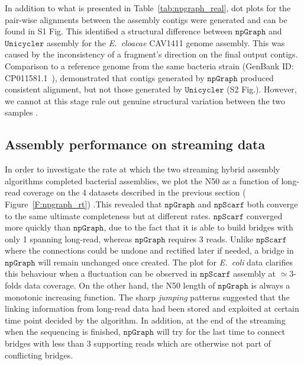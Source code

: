 \documentclass[10pt,letterpaper]{article}
\newcommand{\npscarf}{$\mathtt{npScarf}$}
\newcommand{\npgraph}{$\mathtt{npGraph}$}
\newcommand{\unicycler}{$\mathtt{Unicycler}$}
\newcommand{\ec}{\emph{E.~coli}}
\begin{document}
In addition to what is presented in Table~\ref{tab:npgraph_real}, dot plots for the pair-wise alignments between the assembly contigs were generated and can be found in S1 Fig. This identified a structural difference between \npgraph{} and \unicycler{} assembly for the \emph{E.~cloacae} CAV1411 genome assembly. This was caused by the inconsistency of a fragment's direction on the final output contigs. Comparison to a reference 
 genome from the same bacteria strain (GenBank ID: CP011581.1~\cite{Potter2016rapid}), demonstrated that contigs generated by \npgraph{} produced consistent alignment, but not those generated by \unicycler{} (S2 Fig.). However, we cannot at this stage rule out genuine structural variation between the two samples .

\subsection*{Assembly performance on streaming data}
In order to investigate the rate at which the two streaming hybrid assembly algorithms completed bacterial assemblies, we plot the N50 as a function of long-read coverage on the 4 datasets described in the previous section ( Figure~\ref{F:npgraph_rt}) .This revealed that \npgraph{} and \npscarf{} both converge to the same ultimate completeness but at different rates. \npscarf{} converged more quickly than \npgraph{}, due to the fact that it is able to build bridges with only 1 spanning long-read, whereas \npgraph{} requires 3 reads.    
Unlike \npscarf{} where the connections could be undone and rectified later if needed, a bridge in \npgraph{} will remain unchanged once created.
The plot for \ec{} data clarifies this behaviour when a fluctuation can be observed in \npscarf{} assembly at $\simeq 3$-folds data coverage.
On the other hand, the N50 length of \npgraph{} is always a monotonic increasing function. 
The sharp \emph{jumping} patterns suggested that the linking information from long-read data had been stored and exploited at certain time point decided by the algorithm. 
In addition, at the end of the streaming when the sequencing is finished, \npgraph{} will try for the last time to connect bridges with less than 3 supporting reads which are otherwise not part of conflicting bridges.


\end{document}
